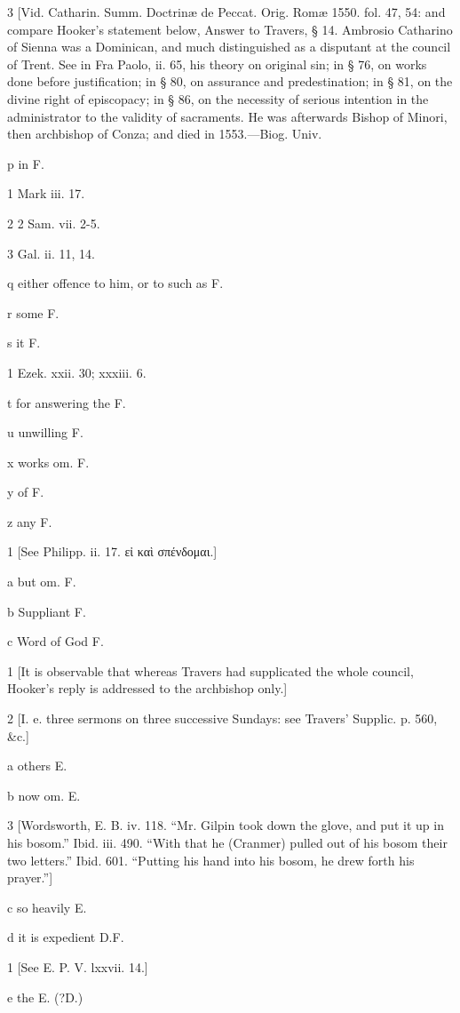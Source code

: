 3
[Vid. Catharin. Summ. Doctrinæ de Peccat. Orig. Romæ 1550. fol. 47, 54: and compare Hooker’s statement below, Answer to Travers, § 14. Ambrosio Catharino of Sienna was a Dominican, and much distinguished as a disputant at the council of Trent. See in Fra Paolo, ii. 65, his theory on original sin; in § 76, on works done before justification; in § 80, on assurance and predestination; in § 81, on the divine right of episcopacy; in § 86, on the necessity of serious intention in the administrator to the validity of sacraments. He was afterwards Bishop of Minori, then archbishop of Conza; and died in 1553.—Biog. Univ.

p
in F.

1
Mark iii. 17.

2
2 Sam. vii. 2-5.

3
Gal. ii. 11, 14.

q
either offence to him, or to such as F.

r
some F.

s
it F.

1
Ezek. xxii. 30; xxxiii. 6.

t
for answering the F.

u
unwilling F.

x
works om. F.

y
of F.

z
any F.

1
[See Philipp. ii. 17. εἰ καὶ σπένδομαι.]

a
but om. F.

b
Suppliant F.

c
Word of God F.

1
[It is observable that whereas Travers had supplicated the whole council, Hooker’s reply is addressed to the archbishop only.]

2
[I. e. three sermons on three successive Sundays: see Travers’ Supplic. p. 560, &c.]

a
others E.

b
now om. E.

3
[Wordsworth, E. B. iv. 118. “Mr. Gilpin took down the glove, and put it up in his bosom.” Ibid. iii. 490. “With that he (Cranmer) pulled out of his bosom their two letters.” Ibid. 601. “Putting his hand into his bosom, he drew forth his prayer.”]

c
so heavily E.

d
it is expedient D.F.

1
[See E. P. V. lxxvii. 14.]

e
the E. (?D.)

